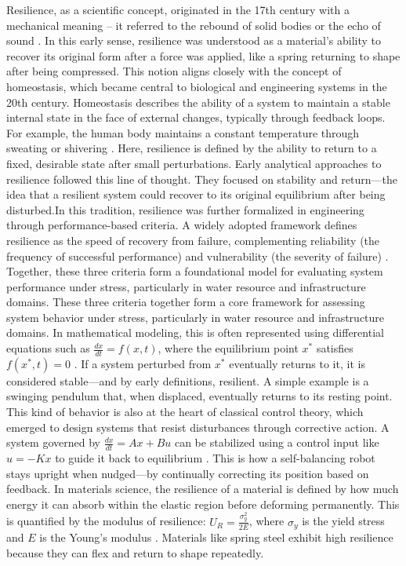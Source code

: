 Resilience, as a scientific concept, originated in the 17th century with a mechanical meaning -- it referred to the rebound of solid bodies or the echo of sound \autocite{alexander2013resilience}. In this early sense, resilience was understood as a material's ability to recover its original form after a force was applied, like a spring returning to shape after being compressed. This notion aligns closely with the concept of homeostasis, which became central to biological and engineering systems in the 20th century. Homeostasis describes the ability of a system to maintain a stable internal state in the face of external changes, typically through feedback loops. For example, the human body maintains a constant temperature through sweating or shivering \autocite{wiener1948cybernetics}. Here, resilience is defined by the ability to return to a fixed, desirable state after small perturbations. Early analytical approaches to resilience followed this line of thought. They focused on stability and return—the idea that a resilient system could recover to its original equilibrium after being disturbed.In this tradition, resilience was further formalized in engineering through performance-based criteria. A widely adopted framework defines resilience as the speed of recovery from failure, complementing reliability (the frequency of successful performance) and vulnerability (the severity of failure) \autocite{hashimoto1982reliability}. Together, these three criteria form a foundational model for evaluating system performance under stress, particularly in water resource and infrastructure domains. These three criteria together form a core framework for assessing system behavior under stress, particularly in water resource and infrastructure domains. In mathematical modeling, this is often represented using differential equations such as $\frac{dx}{dt} = f(x,t)$, where the equilibrium point $x^*$ satisfies $f(x^*,t) = 0$ \autocite{strogatz2018nonlinear}. If a system perturbed from $x^*$ eventually returns to it, it is considered stable—and by early definitions, resilient. A simple example is a swinging pendulum that, when displaced, eventually returns to its resting point. This kind of behavior is also at the heart of classical control theory, which emerged to design systems that resist disturbances through corrective action. A system governed by $\frac{dx}{dt} = Ax + Bu$ can be stabilized using a control input like $u = -Kx$ to guide it back to equilibrium \autocite{astrom2021feedback}. This is how a self-balancing robot stays upright when nudged—by continually correcting its position based on feedback. In materials science, the resilience of a material is defined by how much energy it can absorb within the elastic region before deforming permanently. This is quantified by the modulus of resilience: $U_R = \frac{\sigma_y^2}{2E}$, where $\sigma_y$ is the yield stress and $E$ is the Young’s modulus \autocite{callister2020materials}. Materials like spring steel exhibit high resilience because they can flex and return to shape repeatedly.\\

